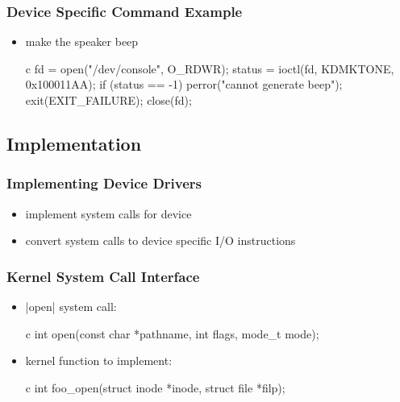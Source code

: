\documentclass[dvipsnames]{beamer}
\begin{document}
\begin{frame}[fragile]
  \frametitle{Device Specific Command Example}

  \begin{itemize}
    \item make the speaker beep

    \medskip
    \begin{pygments}{c}
fd = open("/dev/console", O_RDWR);
status = ioctl(fd, KDMKTONE, 0x100011AA);
if (status == -1)
{
    perror("cannot generate beep");
    exit(EXIT_FAILURE);
}
close(fd);
    \end{pygments}
  \end{itemize}
\end{frame}

\subsection{Implementation}

\begin{frame}
  \frametitle{Implementing Device Drivers}

  \begin{itemize}
    \item implement system calls for device
    \item convert system calls to device specific I/O instructions
  \end{itemize}
\end{frame}

\begin{frame}[fragile]
  \frametitle{Kernel System Call Interface}

  \begin{itemize}
    \item {}|open| system call:
    \begin{pygments}{c}
int open(const char *pathname,
         int flags,
         mode_t mode);
    \end{pygments}

    \medskip
    \item kernel function to implement:
    \begin{pygments}{c}
int foo_open(struct inode *inode,
             struct file *filp);
    \end{pygments}
  \end{itemize}
\end{frame}
\end{document}
